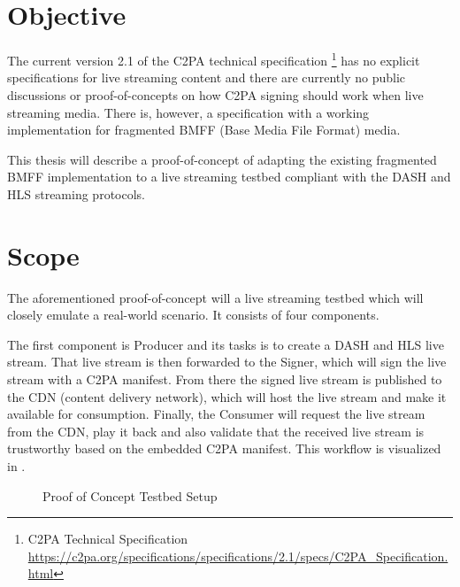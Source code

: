 
\section{Objective\label{sec:objective}}

The current version 2.1 of the C2PA technical specification \footnote{C2PA Technical Specification \url{https://c2pa.org/specifications/specifications/2.1/specs/C2PA_Specification.html}} has no explicit specifications for live streaming content and there are currently no public discussions or proof-of-concepts on how C2PA signing should work when live streaming media. There is, however, a specification with a working implementation for fragmented BMFF (Base Media File Format) media.

This thesis will describe a proof-of-concept of adapting the existing fragmented BMFF implementation to a live streaming testbed compliant with the DASH and HLS streaming protocols.

\section{Scope\label{sec:scope}}

The aforementioned proof-of-concept will a live streaming testbed which will closely emulate a real-world scenario. It consists of four components.

The first component is Producer and its tasks is to create a DASH and HLS live stream. That live stream is then forwarded to the Signer, which will sign the live stream with a C2PA manifest. From there the signed live stream is published to the CDN (content delivery network), which will host the live stream and make it available for consumption. Finally, the Consumer will request the live stream from the CDN, play it back and also validate that the received live stream is trustworthy based on the embedded C2PA manifest. This workflow is visualized in .

\begin{figure}
    \centering
    \caption{Proof of Concept Testbed Setup}
    \label{fig:testbed}
\end{figure}

